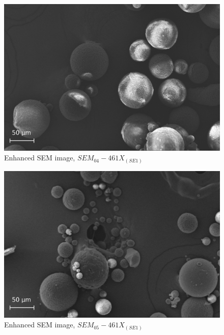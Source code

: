 \documentclass{article}
\begin{document}
                \begin{figure}[h!]
                    \centering 
                    \includegraphics[width=\textwidth]{Pictures/SEM/Edited/05_03.eps}
                    \caption{Enhanced SEM image, $SEM_{04}-461X_{(SE1)}$ \autocites{Pixelmator_Pro}{GIMP}}
                    \label{fig:SEM_04}
                \end{figure}
            
                \begin{figure}[h!]
                    \centering 
                    \includegraphics[width=\textwidth]{Pictures/SEM/Edited/06_01.eps}
                    \caption{Enhanced SEM image, $SEM_{05}-461X_{(SE1)}$ \autocites{Pixelmator_Pro}{GIMP}}
                    \label{fig:SEM_05}
                \end{figure}
            
\end{document}
